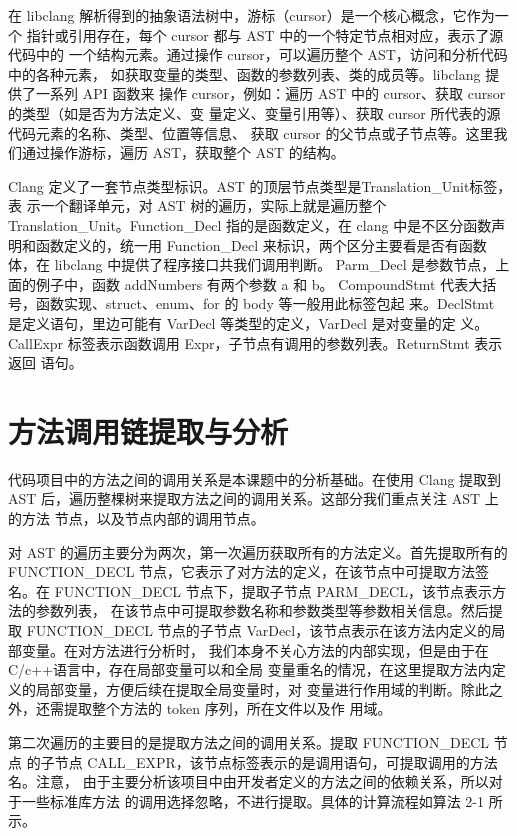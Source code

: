 在 libclang 解析得到的抽象语法树中，游标（cursor）是一个核心概念，它作为一个
指针或引用存在，每个 cursor 都与 AST 中的一个特定节点相对应，表示了源代码中的
一个结构元素。通过操作 cursor，可以遍历整个 AST，访问和分析代码中的各种元素，
如获取变量的类型、函数的参数列表、类的成员等。libclang 提供了一系列 API 函数来
操作 cursor，例如：遍历 AST 中的 cursor、获取 cursor 的类型（如是否为方法定义、变
量定义、变量引用等）、获取 cursor 所代表的源代码元素的名称、类型、位置等信息、
获取 cursor 的父节点或子节点等。这里我们通过操作游标，遍历 AST，获取整个 AST
的结构。


Clang 定义了一套节点类型标识。AST 的顶层节点类型是Translation\_Unit标签，表
示一个翻译单元，对 AST 树的遍历，实际上就是遍历整个 Translation\_Unit。Function\_Decl
指的是函数定义，在 clang 中是不区分函数声明和函数定义的，统一用 Function\_Decl
来标识，两个区分主要看是否有函数体，在 libclang 中提供了程序接口共我们调用判断。
Parm\_Decl 是参数节点，上面的例子中，函数 addNumbers 有两个参数 a 和 b。
CompoundStmt 代表大括号，函数实现、struct、enum、for 的 body 等一般用此标签包起
来。DeclStmt 是定义语句，里边可能有 VarDecl 等类型的定义，VarDecl 是对变量的定
义。CallExpr 标签表示函数调用 Expr，子节点有调用的参数列表。ReturnStmt 表示返回
语句。






\section{方法调用链提取与分析}
代码项目中的方法之间的调用关系是本课题中的分析基础。在使用 Clang 提取到
AST 后，遍历整棵树来提取方法之间的调用关系。这部分我们重点关注 AST 上的方法
节点，以及节点内部的调用节点。


对 AST 的遍历主要分为两次，第一次遍历获取所有的方法定义。首先提取所有的
FUNCTION\_DECL 节点，它表示了对方法的定义，在该节点中可提取方法签名。在
FUNCTION\_DECL 节点下，提取子节点 PARM\_DECL，该节点表示方法的参数列表，
在该节点中可提取参数名称和参数类型等参数相关信息。然后提取 FUNCTION\_DECL
节点的子节点 VarDecl，该节点表示在该方法内定义的局部变量。在对方法进行分析时，
我们本身不关心方法的内部实现，但是由于在 C/c++语言中，存在局部变量可以和全局
变量重名的情况，在这里提取方法内定义的局部变量，方便后续在提取全局变量时，对
变量进行作用域的判断。除此之外，还需提取整个方法的 token 序列，所在文件以及作
用域。


第二次遍历的主要目的是提取方法之间的调用关系。提取 FUNCTION\_DECL 节点
的子节点 CALL\_EXPR，该节点标签表示的是调用语句，可提取调用的方法名。注意，
由于主要分析该项目中由开发者定义的方法之间的依赖关系，所以对于一些标准库方法
的调用选择忽略，不进行提取。具体的计算流程如算法 2-1 所示。

